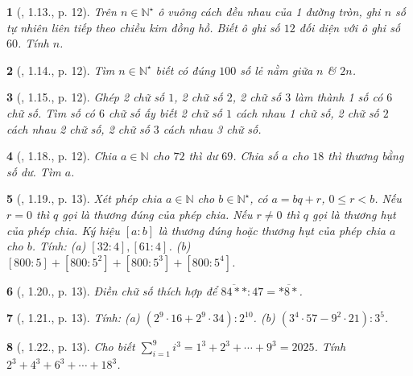 \documentclass{article}
\newtheorem{baitoan}{}
\begin{document}
\begin{baitoan}[\cite{TLCT_THCS_Toan_6_so_hoc}, 1.13., p. 12]
	Trên $n\in\mathbb{N}^\star$ ô vuông cách đều nhau của 1 đường tròn, ghi $n$ số tự nhiên liên tiếp theo chiều kim đồng hồ. Biết ô ghi số $12$ đối diện với ô ghi số $60$. Tính $n$.
\end{baitoan}

\begin{baitoan}[\cite{TLCT_THCS_Toan_6_so_hoc}, 1.14., p. 12]
	Tìm $n\in\mathbb{N}^\star$ biết có đúng $100$ số lẻ nằm giữa $n$ \& $2n$.
\end{baitoan}

\begin{baitoan}[\cite{TLCT_THCS_Toan_6_so_hoc}, 1.15., p. 12]
	Ghép 2 chữ số $1$, 2 chữ số $2$, 2 chữ số $3$ làm thành 1 số có $6$ chữ số. Tìm số có $6$ chữ số ấy biết 2 chữ số $1$ cách nhau 1 chữ số, 2 chữ số $2$ cách nhau 2 chữ số, 2 chữ số $3$ cách nhau 3 chữ số.
\end{baitoan}

\begin{baitoan}[\cite{TLCT_THCS_Toan_6_so_hoc}, 1.18., p. 12]
	Chia $a\in\mathbb{N}$ cho $72$ thì dư $69$. Chia số $a$ cho $18$ thì thương bằng số dư. Tìm $a$.
\end{baitoan}

\begin{baitoan}[\cite{TLCT_THCS_Toan_6_so_hoc}, 1.19., p. 13]
	Xét phép chia $a\in\mathbb{N}$ cho $b\in\mathbb{N}^\star$, có $a = bq + r$, $0\le r < b$. Nếu $r = 0$ thì $q$ gọi là {\rm thương đúng} của phép chia. Nếu $r\ne0$ thì $q$ gọi là {\rm thương hụt} của phép chia. Ký hiệu $[a:b]$ là thương đúng hoặc thương hụt của phép chia $a$ cho $b$. Tính: (a) $[32:4],[61:4]$. (b) $[800:5] + [800:5^2] + [800:5^3] + [800:5^4]$.
\end{baitoan}

\begin{baitoan}[\cite{TLCT_THCS_Toan_6_so_hoc}, 1.20., p. 13]
	Điền chữ số thích hợp để $\overline{84**}:47 = \overline{*8*}$.
\end{baitoan}

\begin{baitoan}[\cite{TLCT_THCS_Toan_6_so_hoc}, 1.21., p. 13]
	Tính: (a) $(2^9\cdot16 + 2^9\cdot34):2^{10}$. (b) $(3^4\cdot57 - 9^2\cdot21):3^5$.
\end{baitoan}

\begin{baitoan}[\cite{TLCT_THCS_Toan_6_so_hoc}, 1.22., p. 13]
	Cho biết $\sum_{i=1}^9 i^3 = 1^3 + 2^3 + \cdots + 9^3 = 2025$. Tính $2^3 + 4^3 + 6^3 + \cdots + 18^3$.
\end{baitoan}
\end{document}
